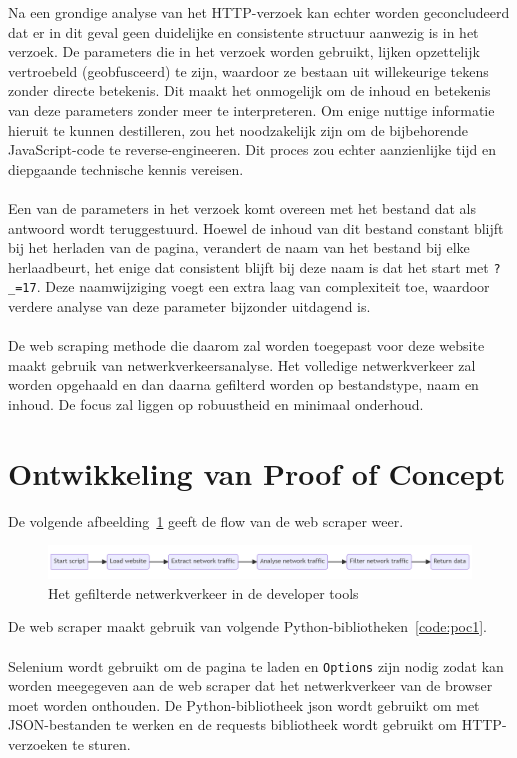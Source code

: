Na een grondige analyse van het HTTP-verzoek kan echter worden geconcludeerd dat er in dit geval geen duidelijke en consistente structuur aanwezig is in het verzoek. De parameters die in het verzoek worden gebruikt, lijken opzettelijk vertroebeld (geobfusceerd) te zijn, waardoor ze bestaan uit willekeurige tekens zonder directe betekenis. Dit maakt het onmogelijk om de inhoud en betekenis van deze parameters zonder meer te interpreteren. Om enige nuttige informatie hieruit te kunnen destilleren, zou het noodzakelijk zijn om de bijbehorende JavaScript-code te reverse-engineeren. Dit proces zou echter aanzienlijke tijd en diepgaande technische kennis vereisen.
\\ \\
Een van de parameters in het verzoek komt overeen met het bestand dat als antwoord wordt teruggestuurd. Hoewel de inhoud van dit bestand constant blijft bij het herladen van de pagina, verandert de naam van het bestand bij elke herlaadbeurt, het enige dat consistent blijft bij deze naam is dat het start met \texttt{?\_=17}. Deze naamwijziging voegt een extra laag van complexiteit toe, waardoor verdere analyse van deze parameter bijzonder uitdagend is.
\\ \\
De web scraping methode die daarom zal worden toegepast voor deze website maakt gebruik van netwerkverkeersanalyse. Het volledige netwerkverkeer zal worden opgehaald en dan daarna gefilterd worden op bestandstype, naam en inhoud. De focus zal liggen op robuustheid en minimaal onderhoud.

\section{Ontwikkeling van Proof of Concept}
De volgende afbeelding~\ref{fig:flowchart2} geeft de flow van de web scraper weer.
\begin{figure}[h]
    \centering
    \includegraphics[width=\linewidth]{graphics/flow-chart2.png}
    \caption{Het gefilterde netwerkverkeer in de developer tools}
    \label{fig:flowchart2}
\end{figure}

De web scraper maakt gebruik van volgende Python-bibliotheken~\ref{code:poc1}.
\\ \\
Selenium wordt gebruikt om de pagina te laden en \texttt{Options} zijn nodig zodat kan worden meegegeven aan de web scraper dat het netwerkverkeer van de browser moet worden onthouden. De Python-bibliotheek json wordt gebruikt om met JSON-bestanden te werken en de requests bibliotheek wordt gebruikt om HTTP-verzoeken te sturen.

